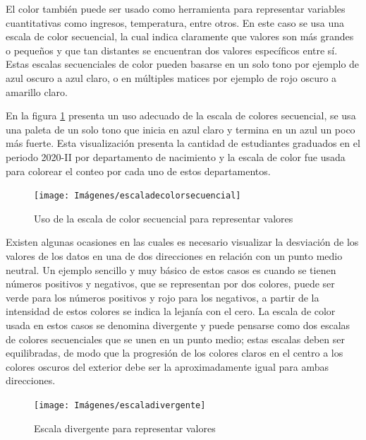 \documentclass[
]{book}
\begin{document}
El color también puede ser usado como herramienta para representar variables cuantitativas como ingresos, temperatura, entre otros. En este caso se usa una escala de color secuencial, la cual indica claramente que valores son más grandes o pequeños y que tan distantes se encuentran dos valores específicos entre sí. Estas escalas secuenciales de color pueden basarse en un solo tono por ejemplo de azul oscuro a azul claro, o en múltiples matices por ejemplo de rojo oscuro a amarillo claro.

En la figura \ref{fig:usocolorrepresentar-fig} presenta un uso adecuado de la escala de colores secuencial, se usa una paleta de un solo tono que inicia en azul claro y termina en un azul un poco más fuerte. Esta visualización presenta la cantidad de estudiantes graduados en el periodo 2020-II por departamento de nacimiento y la escala de color fue usada para colorear el conteo por cada uno de estos departamentos.

\begin{figure}

{\centering \texttt{[image: Imágenes/escaladecolorsecuencial]} 

}

\caption{Uso de la escala de color secuencial para representar valores}\label{fig:usocolorrepresentar-fig}
\end{figure}

Existen algunas ocasiones en las cuales es necesario visualizar la desviación de los valores de los datos en una de dos direcciones en relación con un punto medio neutral. Un ejemplo sencillo y muy básico de estos casos es cuando se tienen números positivos y negativos, que se representan por dos colores, puede ser verde para los números positivos y rojo para los negativos, a partir de la intensidad de estos colores se indica la lejanía con el cero. La escala de color usada en estos casos se denomina divergente y puede pensarse como dos escalas de colores secuenciales que se unen en un punto medio; estas escalas deben ser equilibradas, de modo que la progresión de los colores claros en el centro a los colores oscuros del exterior debe ser la aproximadamente igual para ambas direcciones.

\begin{figure}

{\centering \texttt{[image: Imágenes/escaladivergente]} 

}

\caption{Escala divergente para representar valores}\label{fig:escaladivergente-fig}
\end{figure}
\end{document}
